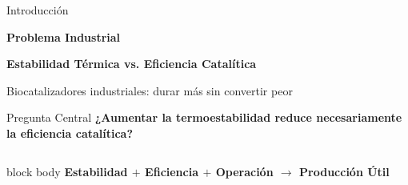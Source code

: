 \begin{frame}[label=inicio]{Introducción}

\centering
{\color{Cian}\bfseries Problema Industrial}\par
\vspace{0.05cm}
{\Large\bfseries Estabilidad Térmica vs. Eficiencia Catalítica}\par
\vspace{0.03cm}
{\scriptsize\color{TextoSuave}Biocatalizadores industriales: durar más sin convertir peor}

\vspace{0.14cm}
\begin{alertblock}{Pregunta Central}
\centering
\small\bfseries
¿Aumentar la termoestabilidad reduce necesariamente la eficiencia catalítica?
\end{alertblock}

\vspace{0.09cm}
\begin{columns}[T,onlytextwidth]
\end{columns}

\vspace{0.10cm}
\begin{beamercolorbox}[wd=0.86\textwidth,sep=0.10cm,rounded=true,center]{block body}
\small\bfseries\color{CianClaro}
Estabilidad $+$ Eficiencia $+$ Operación $\longrightarrow$ Producción Útil
\end{beamercolorbox}

\vfill
{}
\end{frame}
